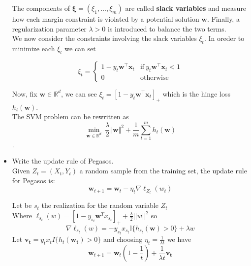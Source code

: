 \begin{itemize}
        The components of $\boldsymbol{\xi} = (\xi_1, \dots, \xi_m)$ are called \textbf{slack variables} and measure how each margin constraint is violated by a potential solution $\boldsymbol{w}$. Finally, a regularization parameter $\lambda > 0$ is introduced to balance the two terms.\\

        We now consider the constraints involving the slack variables $\xi_t$. In oreder to minimize each $\xi_t$ we can set
        
        \begin{equation}
            \xi_t =
            \begin{cases}
                1 - y_t \boldsymbol{w}^\top \boldsymbol{x}_t & \text{if} \ y_t \boldsymbol{w}^\top \boldsymbol{x}_t < 1 \\                
                0 & \text{otherwise}
            \end{cases}
        \end{equation}
        
        Now, fix $\boldsymbol{w} \in \mathbb{R}^d$, we can see $\xi_t = \left[1 - y_t \boldsymbol{w}^\top \boldsymbol{x}_t \right]_+$ which is the hinge loss  $h_{t}(\boldsymbol{w})$.\\

        The SVM problem can be rewritten as $$\underset{\boldsymbol{w} \in \mathbb{R}^d}{\min} \ \frac{\lambda}{2} \Vert \boldsymbol{w} \Vert^2 + \frac{1}{m} \sum_{t = 1}^m h_{t}(\boldsymbol{w})$$.\\

    \newpage
    \item Write the update rule of Pegasos.\\
        
        Given $Z_t = (X_t, Y_t)$ a random sample from the training set, the update rule for Pegasos is:\\
        $$\boldsymbol{w}_{t+1} = \boldsymbol{w}_t - \eta_t \nabla\ell_{Z_t}(w_t)$$

        Let be $s_t$ the realization for the random variable $Z_t$\\ 
        Where $\ell_{s_t}(w) = \left[1 - y_{s_t} \boldsymbol{w}^T x_{s_t}\right]_+ + \frac{\lambda}{2} ||w||^2$ so
        $$\nabla\ell_{s_t}(w) = -y_{s_t} x_{s_t} \mathbb{I}\{h_{s_t}(\boldsymbol{w}) > 0\} + \lambda w $$
        Let $\boldsymbol{v_t} = y_t x_t I\{h_t(\boldsymbol{w_t}) > 0\}$ and choosing $\eta_t = \frac{1}{\lambda t}$ we have
        $$\boldsymbol{w}_{t+1} = \boldsymbol{w}_t (1 - \frac{1}{t}) + \frac{1}{\lambda t} \boldsymbol{v_t}$$



\end{itemize}

